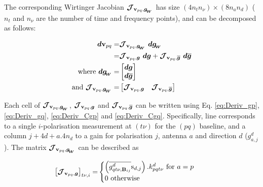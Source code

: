 The corresponding Wirtinger Jacobian $\bm{\mathcal{J}}_{{\textbf{v}_{pq}},\bm{g_{\!_{W}}}}$ has size $(4n_t n_{\nu})\times (8n_a n_d)$ ($n_t$
and $n_{\nu}$ are the number of time and frequency points), and can be
decomposed as follows:

\begin{alignat}{2}
\label{eq:dV}
\dbf\vbl=&\JVpq\ \dbf\gwirt\\
=&\JVpqg\ \dbf\g+\JVpqCg\ \dbf\conj{\g}\\
\text{where }\dgwirt=&
\begin{bmatrix}
\dbf\vec{g}\\
\dbf\conj{\vec{g}}
\end{bmatrix}\\
\text{and }\JVpq=&
\begin{bmatrix}
\JVpqg & \JVpqCg
\end{bmatrix}
\end{alignat}







Each cell of
$\bm{\mathcal{J}}_{{\textbf{v}_{pq}},\bm{g_{\!_{W}}}}$, $\bm{\mathcal{J}}_{{\textbf{v}_{pq}},\bm{g}}$ and $\bm{\mathcal{J}}_{{\textbf{v}_{pq}},\bm{\overline{g}}}$ can be written using Eq. \ref{eq:Deriv_gp}, \ref{eq:Deriv_gq},
\ref{eq:Deriv_Cgp} and \ref{eq:Deriv_Cgq}. Specifically, line corresponds to a
single $i$-polarisation measurement at $(t\nu)$ for the $(pq)$ baseline, and a column
$j+4d+a.4n_d$ to a gain for polarisation $j$, antenna $a$ and
direction $d$ ($g^{d}_{a,j}$). The matrix $\bm{\mathcal{J}}_{{\textbf{v}_{pq}},\bm{g_{\!_{W}}}}$ can be described as




\begin{alignat}{2}
\label{eq:Jpq0}
\left[\bm{\mathcal{J}}_{{\textbf{v}_{pq}},\bm{g}}\right]_{t\nu,i}=&
\begin{cases}
\left(\overline{g^{d}_{qt\nu,\textbf{B}_{ij}}}\text{s}_{d,j}\right).k^{d}_{pqt\nu}\text{ for }a=p\\
0\ \text{otherwise}
\end{cases}
\end{alignat}

